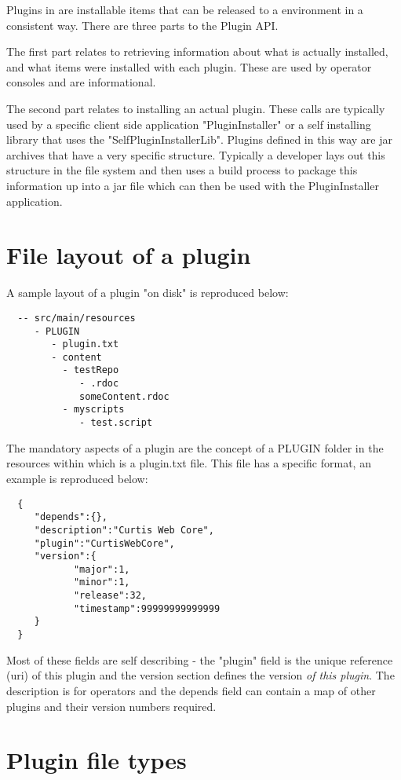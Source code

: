 Plugins in \Rapture are installable items that can be released to a \Rapture environment in
a consistent way. There are three parts to the Plugin API.

The first part relates to retrieving information about what is actually installed, and what items were installed with each
plugin. These are used by operator consoles and are informational.

The second part relates to installing an actual plugin. These calls are typically used by a specific
client side application "PluginInstaller" or a self installing library that uses the "SelfPluginInstallerLib". Plugins
defined in this way are jar archives that have a very specific structure. Typically a developer lays out this structure
in the file system and then uses a build process to package this information up into a jar file which can then be used with
the PluginInstaller application.

\section{File layout of a plugin}

A sample layout of a plugin "on disk" is reproduced below:

\begin{Verbatim}
  -- src/main/resources
     - PLUGIN
        - plugin.txt
        - content
          - testRepo
             - .rdoc
             someContent.rdoc
          - myscripts
             - test.script
\end{Verbatim}

The mandatory aspects of a plugin are the concept of a PLUGIN folder in the resources within
which is a plugin.txt file. This file has a specific format, an example is reproduced below:

\begin{Verbatim}
  {
     "depends":{},
     "description":"Curtis Web Core",
     "plugin":"CurtisWebCore",
     "version":{
     		"major":1,
     		"minor":1,
     		"release":32,
     		"timestamp":99999999999999
     }
  }
\end{Verbatim}

Most of these fields are self describing - the "plugin" field is the unique reference (uri) of this
plugin and the version section defines the version \emph{of this plugin}. The description is for operators
and the depends field can contain a map of other plugins and their version numbers required.

\section{Plugin file types}

